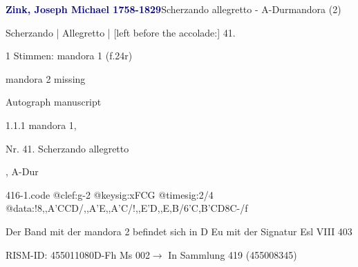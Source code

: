 \documentclass[twocolumn]{book}
\begin{document}
\par \vspace{7pt} \textcolor{darkblue}{\textbf{Zink, Joseph Michael  1758-1829}}\hfillplus{\textbf{[416]}}\newline Scherzando allegretto - A-Dur\newline mandora (2)
\par \begin{itshape}[f.24r, at left:] Scherzando | Allegretto | [left before the accolade:] 41.\end{itshape} 
\par \textcolor{darkblue}{}  1 Stimmen: mandora 1  (f.24r)\newline \begin{small} mandora 2 missing\end{small} \newline Autograph manuscript
\par 1.1.1  mandora 1, \begin{itshape}Nr. 41. Scherzando allegretto\end{itshape}, A-Dur  
\begin{filecontents*}{416-1.code}
@clef:g-2
@keysig:xFCG
@timesig:2/4
@data:!8,,A'CCD/,,A'E,,A'C/!,,E'D,,E,B/{6'C,B'CD}8C-/f
\end{filecontents*}
\newline
%
\par Der Band mit der mandora 2 befindet sich in D Eu mit der Signatur Esl VIII 403
\par RISM-ID: 455011080\newline D-Fh  Ms 002\newline $\rightarrow$ In Sammlung 419 (455008345)
      
\end{document}
